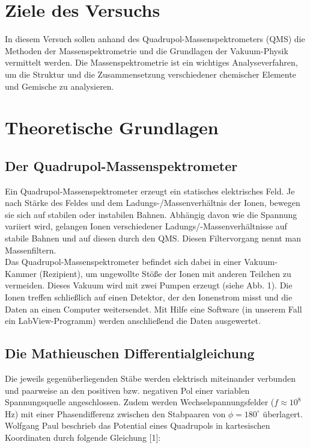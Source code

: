 \section{Ziele des Versuchs}
In diesem Versuch sollen anhand des Quadrupol-Massenspektrometers (QMS) die Methoden der Massenspektrometrie und die Grundlagen der Vakuum-Physik vermittelt werden. Die Massenspektrometrie ist ein wichtiges Analyseverfahren, um die Struktur und die Zusammensetzung verschiedener chemischer Elemente und Gemische zu analysieren.\\

\section{Theoretische Grundlagen}
\subsection{Der Quadrupol-Massenspektrometer}
Ein Quadrupol-Massenspektrometer erzeugt ein statisches elektrisches Feld. Je nach Stärke des Feldes und dem Ladungs-/Massenverhältnis der Ionen, bewegen sie sich auf stabilen oder instabilen Bahnen. Abhängig davon wie die Spannung variiert wird, gelangen Ionen verschiedener Ladungs/-Massenverhältnisse auf stabile Bahnen und auf diesen durch den QMS. Diesen Filtervorgang nennt man Massenfiltern.\\
Das Quadrupol-Massenspektrometer befindet sich dabei in einer Vakuum-Kammer (Rezipient), um ungewollte Stöße der Ionen mit anderen Teilchen zu vermeiden. Dieses Vakuum wird mit zwei Pumpen erzeugt (siehe Abb. 1). Die Ionen treffen schließlich auf einen Detektor, der den Ionenstrom misst und die Daten an einen Computer weitersendet. Mit Hilfe eine Software (in unserem Fall ein LabView-Programm) werden anschließend die Daten ausgewertet.


\newpage
\subsection{Die Mathieuschen Differentialgleichung}
Die jeweils gegenüberliegenden Stäbe werden elektrisch miteinander verbunden und paarweise an den positiven bzw. negativen Pol einer variablen Spannungsquelle angeschlossen. Zudem werden Wechselspannungsfelder ($f \approx 10^8$ Hz) mit einer Phasendifferenz zwischen den Stabpaaren von $\phi = 180^{\circ}$ überlagert.
Wolfgang Paul beschrieb das Potential eines Quadrupols in kartesischen Koordinaten durch folgende Gleichung [1]:

